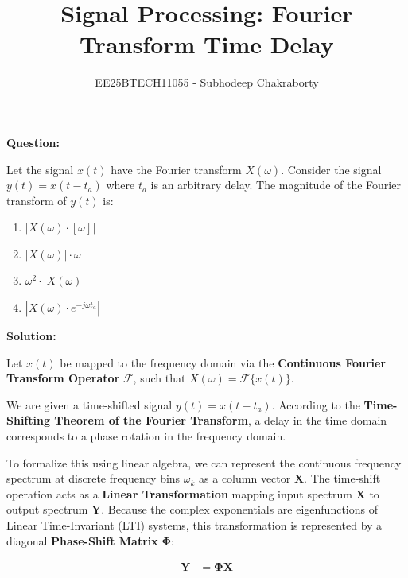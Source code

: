 \documentclass[journal,12pt,onecolumn]{IEEEtran}
\theoremstyle{remark}
\begin{document}

\vspace{3cm}

\title{Signal Processing: Fourier Transform Time Delay}
\author{EE25BTECH11055 - Subhodeep Chakraborty}
\maketitle
\hrulefill
\bigskip

\renewcommand{\thefigure}{\theenumi}
\renewcommand{\thetable}{\theenumi}

\textbf{Question:}\par
Let the signal $x(t)$ have the Fourier transform $X(\omega)$. Consider the signal $y(t) = x(t-t_a)$ where $t_a$ is an arbitrary delay. The magnitude of the Fourier transform of $y(t)$ is:
\begin{enumerate}[label=\alph*)]
    \item $|X(\omega) \cdot [\omega]|$
    \item $|X(\omega)| \cdot \omega$
    \item $\omega^2 \cdot |X(\omega)|$
    \item $|X(\omega) \cdot e^{-j\omega t_a}|$
\end{enumerate}

\textbf{Solution:}\par

Let $x(t)$ be mapped to the frequency domain via the \textbf{Continuous Fourier Transform Operator} $\mathcal{F}$, such that $X(\omega) = \mathcal{F}\{x(t)\}$.

We are given a time-shifted signal $y(t) = x(t - t_a)$. According to the \textbf{Time-Shifting Theorem of the Fourier Transform}, a delay in the time domain corresponds to a phase rotation in the frequency domain.

To formalize this using linear algebra, we can represent the continuous frequency spectrum at discrete frequency bins $\omega_k$ as a column vector $\mathbf{X}$. The time-shift operation acts as a \textbf{Linear Transformation} mapping input spectrum $\mathbf{X}$ to output spectrum $\mathbf{Y}$. Because the complex exponentials are eigenfunctions of Linear Time-Invariant (LTI) systems, this transformation is represented by a diagonal \textbf{Phase-Shift Matrix} $\mathbf{\Phi}$:

\begin{align}
    \mathbf{Y} &= \mathbf{\Phi} \mathbf{X}
\end{align}
\end{document}
